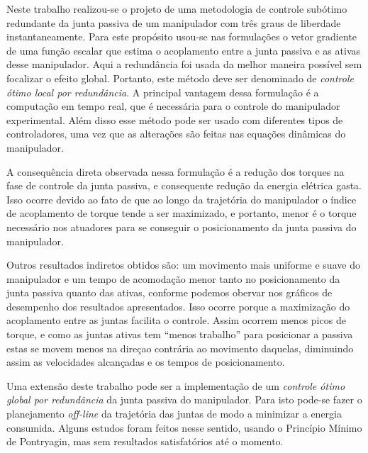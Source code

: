 
Neste trabalho realizou-se o projeto de uma metodologia de controle subótimo redundante da junta passiva de um manipulador com três graus de liberdade instantaneamente. Para este propósito usou-se nas formulações o vetor gradiente de uma função escalar que estima o acoplamento entre a junta passiva e as ativas desse manipulador. Aqui a redundância
foi usada da melhor maneira possível sem focalizar o efeito global. Portanto, este método deve ser denominado de \emph{controle ótimo local por redundância}. A principal vantagem dessa formulação é a computação em tempo real, que é
necessária para o controle do manipulador experimental. Além disso esse método pode ser usado com diferentes tipos de controladores, uma vez que as alterações são feitas nas equações dinâmicas do manipulador.

A consequência direta observada nessa formulação é a redução dos torques na fase de controle da junta passiva, e consequente redução da energia elétrica gasta. Isso ocorre devido ao fato de que ao longo da trajetória do manipulador
o índice de acoplamento de torque tende a ser maximizado, e portanto, menor é o torque necessário nos atuadores para se conseguir o posicionamento da junta passiva do manipulador.

Outros resultados indiretos obtidos são: um movimento mais uniforme e suave do manipulador e um tempo de acomodação menor tanto no posicionamento da junta passiva quanto das ativas, conforme podemos obervar nos gráficos de desempenho dos resultados apresentados. Isso ocorre porque a maximização do acoplamento entre as juntas facilita o controle. Assim
ocorrem menos picos de torque, e como as juntas ativas tem ``menos trabalho'' para posicionar a passiva estas se movem menos na direçao contrária ao movimento daquelas, diminuindo assim as velocidades alcançadas e os tempos de posicionamento.

Uma extensão deste trabalho pode ser a implementação de um \emph{controle ótimo global por redundância} da junta passiva do manipulador. Para isto pode-se fazer o planejamento \emph{off-line} da trajetória das juntas de modo a minimizar a energia consumida. Alguns estudos foram feitos nesse sentido, usando o Princípio Mínimo de Pontryagin, mas sem resultados satisfatórios até o momento.


